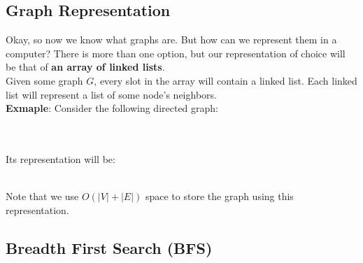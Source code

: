 \documentclass[12pt]{article}
\def\LinkedList#1{%
  \foreach \element in \list {
     \node[node of list, right = of aux, name=ele] {\element};
     \draw[link] (aux) -- (ele);
     \coordinate (aux) at (ele.east);
  } 
}
\begin{document}
\subsection{Graph Representation}

Okay, so now we know what graphs are. But how can we represent them in a computer? There is more than one option, but our representation of choice will be that of \textbf{an array of linked lists}. \\
Given some graph $G$, every slot in the array will contain a linked list. Each linked list will represent a list of some node's neighbors.\\

\textbf{Exmaple}: Consider the following directed graph: \\ \\
 \\ 

Its representation will be: \\ \\

\begin{remark} Note that we use $O(|V|+|E|)$ space to store the graph using this representation.
\end{remark}

\subsection{Breadth First Search (BFS)}
\end{document}
